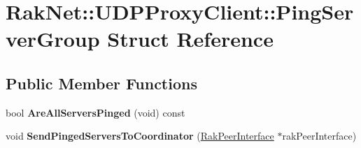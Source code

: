 \hypertarget{struct_rak_net_1_1_u_d_p_proxy_client_1_1_ping_server_group}{\section{Rak\-Net\-:\-:U\-D\-P\-Proxy\-Client\-:\-:Ping\-Server\-Group Struct Reference}
\label{struct_rak_net_1_1_u_d_p_proxy_client_1_1_ping_server_group}
}
\subsection*{Public Member Functions}
\begin{DoxyCompactItemize}
\item 
\hypertarget{struct_rak_net_1_1_u_d_p_proxy_client_1_1_ping_server_group_ae4c1eb63be28b55f8740ff06a179aa65}{bool {\bfseries Are\-All\-Servers\-Pinged} (void) const }\label{struct_rak_net_1_1_u_d_p_proxy_client_1_1_ping_server_group_ae4c1eb63be28b55f8740ff06a179aa65}

\item 
\hypertarget{struct_rak_net_1_1_u_d_p_proxy_client_1_1_ping_server_group_aa2dacb314196c67be643b0e4168c6089}{void {\bfseries Send\-Pinged\-Servers\-To\-Coordinator} (\hyperlink{class_rak_net_1_1_rak_peer_interface}{Rak\-Peer\-Interface} $\ast$rak\-Peer\-Interface)}\label{struct_rak_net_1_1_u_d_p_proxy_client_1_1_ping_server_group_aa2dacb314196c67be643b0e4168c6089}

\end{DoxyCompactItemize}
